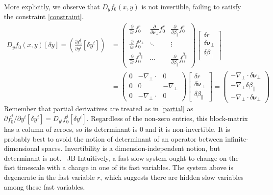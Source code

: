 \documentclass{article}
\newcommand{\para}{\parallel}
\newcommand{\np}{\nabla_\perp}
\newcommand{\p}{\partial}
\newcommand{\deriv}[2]{\frac{\p #1}{\p #2}}
\newcommand{\pth} [1] {\left( #1 \right) }
\newcommand{\br} [1] {\left[ #1 \right] }
\newcommand{\bmat} [1] {\begin{bmatrix} #1 \end{bmatrix}}
\newcommand{\pmat} [1] {\begin{pmatrix} #1 \end{pmatrix}}
\begin{document}
More explicitly, we observe that $D_yf_0(x,y)$ is not invertible, failing to satisfy the constraint \eqref{constraint}. 
\begin{equation} \begin{split}
    D_yf_0(x,y) [\delta y] = \pth{\deriv{f_0^j}{y^i} \br{\delta y^i}} 
    &= \pmat{\deriv{}{r}f_0^r & \deriv{}{\bm{\nu}_\perp}f_0^r & \deriv{}{\beta_\para}f_0^r\\ \deriv{}{r}f_0^{\bm{\nu}_\perp} & \ddots & \vdots \\ \deriv{}{r}f_0^{\beta_\para} & \cdots & \deriv{}{\beta_\para}f_0^{\beta_\para}} 
    \bmat{\delta r \\ \delta \bm{\nu}_\perp \\ \delta \beta_\para} \\
    &= \pmat{0 & -\np \cdot & 0 \\ 0 & 0 & -\np \\ 0 & -\np \cdot & 0} 
    \bmat{\delta r \\ \delta \bm{\nu}_\perp \\ \delta \beta_\para}
    = \pmat{-\np \cdot \delta \bm{\nu}_\perp \\ -\np \delta \beta_\para \\ -\np \cdot \delta \bm{\nu}_\perp }
\end{split} \end{equation}
Remember that partial derivatives are treated as in \eqref{partial} as $\p f_0^j/\p y^i \br{\delta y^i} = D_{y^i} f_0^j \br{\delta y^i}$. Regardless of the non-zero entries, this block-matrix has a column of zeroes, so its determinant is $0$ and it is non-invertible. {\color{red}It is probably best to avoid the notion of determinant of an operator between infinite-dimensional spaces. Invertibility is a dimension-independent notion, but determinant is not. --JB} Intuitively, a fast-slow system ought to change on the fast timescale with a change in one of its fast variables. The system above is degenerate in the fast variable $r$, which suggests there are hidden slow variables among these fast variables. 
\end{document}
